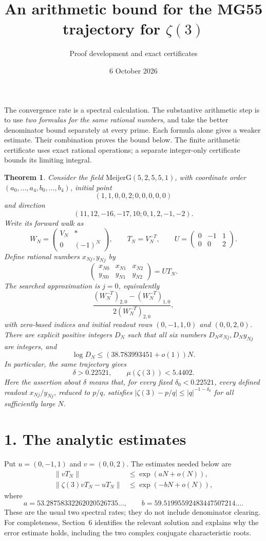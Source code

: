 \documentclass[11pt]{article}
\title{An arithmetic bound for the MG55 trajectory for $\zeta(3)$}
\author{Proof development and exact certificates}
\date{6 October 2026}
\newtheorem{theorem}{Theorem}
\newcommand{\z}{\zeta(3)}
\begin{document}
\maketitle

\noindent The convergence rate is a spectral calculation. The substantive
arithmetic step is to use \emph{two formulas for the same rational numbers},
and take the better denominator bound separately at every prime. Each formula
alone gives a weaker estimate. Their combination proves the bound below.
The finite arithmetic certificate uses exact rational operations; a separate
integer-only certificate bounds its limiting integral.

\begin{theorem}\label{thm:main}
Consider the field $\mathrm{MeijerG}(5,2,5,5,1)$, with coordinate order
$(a_0,\ldots,a_4,b_0,\ldots,b_4)$, initial point
\[
 (1,1,0,0,2;0,0,0,0,0)
\]
and direction
\[
 (11,12,-16,-17,10;0,1,2,-1,-2).
\]
Write its forward walk as
\[
 W_N=\begin{pmatrix}V_N&*\\0&(-1)^N\end{pmatrix},\qquad
 T_N=V_N^{-T},\qquad
 U=\begin{pmatrix}0&-1&1\\0&0&2\end{pmatrix}.
\]
Define rational numbers $x_{Nj},y_{Nj}$ by
\[
 \begin{pmatrix}x_{N0}&x_{N1}&x_{N2}\\y_{N0}&y_{N1}&y_{N2}\end{pmatrix}=UT_N.
\]
The searched approximation is $j=0$, equivalently
\[
 \frac{(W_N^{-T})_{2,0}-(W_N^{-T})_{1,0}}{2(W_N^{-T})_{2,0}},
\]
with zero-based indices and initial readout rows $(0,-1,1,0)$ and $(0,0,2,0)$.
There are explicit positive integers $D_N$ such that all six numbers
$D_Nx_{Nj},D_Ny_{Nj}$ are integers, and
\[
 \log D_N\le (38.783993451+o(1))N.
\]
In particular, the same trajectory gives
\[
 \boxed{\delta>0.22521,\qquad \mu(\zeta(3))<5.4402.}
\]
Here the assertion about $\delta$ means that, for every fixed
$\delta_0<0.22521$, every defined readout $x_{Nj}/y_{Nj}$, reduced to
$p/q$, satisfies $|\z-p/q|\le |q|^{-1-\delta_0}$ for all sufficiently large $N$.
\end{theorem}

\section*{1. The analytic estimates}
Put $u=(0,-1,1)$ and $v=(0,0,2)$. The estimates needed below are
\begin{align}
 \|vT_N\|&\le \exp(aN+o(N)),\label{eq:qgrowth}\\
 \|\z vT_N-uT_N\|&\le \exp(-bN+o(N)),\label{eq:error}
\end{align}
where
\[
 a=53.28758332262020526735\ldots,\qquad
 b=59.51995592483447507214\ldots.
\]
These are the usual two spectral rates; they do not include denominator
clearing. For completeness, Section~6 identifies the relevant solution and
explains why the error estimate holds, including the two complex conjugate
characteristic roots.
\end{document}
